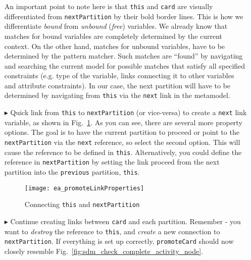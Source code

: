\begin{itemize}
An important point to note here is that \texttt{this} and \texttt{card} are visually differentiated from \texttt{nextPartition} by
their bold border lines. This is how we differentiate \emph{bound} from \emph{unbound} (\emph{free}) variables. We already know that matches for bound
variables are completely determined by the current context. On the other hand, matches for unbound variables, have to be determined by the pattern matcher. Such
matches are ``found'' by navigating and searching the current model for possible matches that satisfy all specified constraints (e.g. type of the variable,
links connecting it to other variables and attribute constraints). In our case, the next partition will have to be determined by navigating from \texttt{this}
via the \texttt{next} link in the metamodel.

\vspace{0.5cm}

\item[$\blacktriangleright$] Quick link from \texttt{this} to \texttt{nextPartition} (or vice-versa) to create a \texttt{next} link variable, as shown in
Fig.~\ref{fig:sdm_check_link_variable}. As you can see, there are several more property options. The goal is to have the current partition to proceed or point
to the \texttt{nextPartition} via the \texttt{next} reference, so select the second option. This will cause the reference to be defined in \texttt{this}.
Alternatively, you could define the reference in \texttt{nextPartition} by setting the link proceed from the next partition into the \texttt{previous}
partition, \texttt{this}.

\begin{figure}[htbp]
\begin{center}
  \texttt{[image: ea\_promoteLinkProperties]}
  \caption{Connecting \texttt{this} and \texttt{nextPartition}}
  \label{fig:sdm_check_link_variable}
\end{center}
\end{figure}

\vspace{0.5cm}

\item[$\blacktriangleright$] Continue creating links between \texttt{card} and each partition. Remember - you want to \emph{destroy} the reference to
\texttt{this}, and \emph{create} a new connection to \texttt{nextPartition}. If everything is set up correctly, \texttt{promoteCard} should now closely resemble
Fig.~\ref{fig:sdm_check_complete_activity_node}.


\end{itemize}
